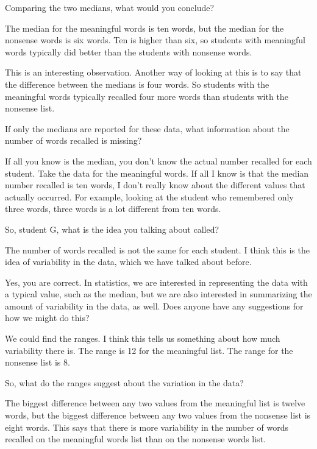 \documentclass[
  10pt,
  a4paper,
  landscape,
  twoside,
  openany
]{scrbook}
\newcounter{example}
\newlength{\scriptlabelwidth}
\newcommand{\scriptlabel}[1]{%
  \normalfont\slshape\makebox[\scriptlabelwidth][l]{#1}%
}
\newenvironment{scriptlist}{%
  \begin{list}{}{%
    \setlength{\labelwidth}{\scriptlabelwidth}%
    \setlength{\labelsep}{0.6em}%
    \setlength{\leftmargin}{\dimexpr\labelwidth+\labelsep\relax}%
    \setlength{\itemindent}{0pt}%
    \setlength{\listparindent}{0pt}%
    \setlength{\parsep}{0pt}%
    \setlength{\itemsep}{0.35\baselineskip}%
    \setlength{\topsep}{0.35\baselineskip}%
    \let\makelabel\scriptlabel
  }%
}{%
  \end{list}%
}
\begin{document}
{\begin{scriptlist}
  \item [Teacher:] Comparing the two medians, what would you conclude?
  \item [Student F:] The median for the meaningful words is ten words, but the median for the nonsense words is six words. Ten is higher than six, so students with meaningful words typically did better than the students with nonsense words.
  \item [Teacher:] This is an interesting observation. Another way of looking at this is to say that the difference between the medians is four words. So students with the meaningful words typically recalled four more words than students with the nonsense list.
  \item [Teacher:] If only the medians are reported for these data, what information about the number of words recalled is missing?
  \item [Student G:] If all you know is the median, you don't know the actual number recalled for each student. Take the data for the meaningful words. If all I know is that the median number recalled is ten words, I don't really know about the different values that actually occurred. For example, looking at the student who remembered only three words, three words is a lot different from ten words.
  \item [Teacher:] So, student G, what is the idea you talking about called?
  \item [Student G:] The number of words recalled is not the same for each student. I think this is the idea of variability in the data, which we have talked about before.
  \item [Teacher:] Yes, you are correct. In statistics, we are interested in representing the data with a typical value, such as the median, but we are also interested in summarizing the amount of variability in the data, as well. Does anyone have any suggestions for how we might do this?
  \item [Student H:] We could find the ranges. I think this tells us something about how much variability there is. The range is 12 for the meaningful list. The range for the nonsense list is $8$.
  \item [Teacher:] So, what do the ranges suggest about the variation in the data?
  \item [Student H:] The biggest difference between any two values from the meaningful list is twelve words, but the biggest difference between any two values from the nonsense list is eight words. This says that there is more variability in the number of words recalled on the meaningful words list than on the nonsense words list.

\end{scriptlist}}
\end{document}
